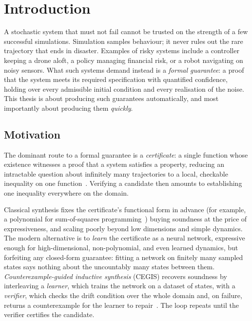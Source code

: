 \normallinespacing

\chapter{Introduction}

A stochastic system that must not fail cannot be trusted on the strength of a few successful
simulations. Simulation samples behaviour; it never rules out the rare
trajectory that ends in disaster. Examples of risky systems include a controller keeping a drone aloft, a policy managing financial risk, or a robot navigating on noisy sensors. What such systems demand instead is a
\emph{formal guarantee}: a proof that the system meets its required specification with
quantified confidence, holding over every admissible initial condition and every
realisation of the noise. This thesis is about producing such guarantees
automatically, and most importantly about producing them
\emph{quickly}.

\section{Motivation}

The dominant route to a formal guarantee is a \emph{certificate}: a single
function whose existence witnesses a proof that a system satisfies a property,
reducing an intractable question about infinitely many trajectories to a local,
checkable inequality on one function~\cite{lyapunov1992general}. Verifying a candidate then
amounts to establishing one inequality everywhere on the domain.

Classical synthesis fixes the certificate's functional form in advance (for example, a
polynomial for sum-of-squares programming~\cite{parrilo2000}) buying soundness at the price of expressiveness, and scaling
poorly beyond low dimensions and simple dynamics. The modern alternative is to
\emph{learn} the certificate as a neural network, expressive enough for
high-dimensional, non-polynomial, and even learned dynamics, but forfeiting any
closed-form guarantee: fitting a network on finitely many sampled states says
nothing about the uncountably many states between them.
\emph{Counterexample-guided inductive synthesis} (CEGIS) recovers soundness by
interleaving a \emph{learner}, which trains the network on a dataset of states,
with a \emph{verifier}, which checks the drift condition over the whole domain
and, on failure, returns a counterexample for the learner to
repair~\cite{chatterjee2023learnerverifier, abate2021fossil}. The loop repeats
until the verifier certifies the candidate.

